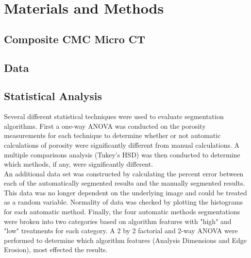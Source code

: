 \documentclass[12pt]{article}
\begin{document}
\section{Materials and Methods}

\subsection{Composite CMC Micro CT } 

\subsection{Data}

\subsection{Statistical Analysis} 
Several different statistical techniques were used to evaluate segmentation algorithms. First a one-way ANOVA was conducted on the porosity measurements for each technique to determine whether or not automatic calculations of porosity were significantly different from manual calculations. A multiple comparisons analysis (Tukey's HSD) was then conducted to determine which methods, if any, were significantly different.\\

An additional data set was constructed by calculating the percent error between each of the automatically segmented results and the manually segmented results. This data was no longer dependent on the underlying image and could be treated as a random variable. Normality of data was checked by plotting the histograms for each automatic method. Finally, the four automatic methods segmentations were broken into two categories based on algorithm features with "high" and "low" treatments for each category. A 2 by 2 factorial and 2-way ANOVA were performed to determine which algorithm features (Analysis Dimensions and Edge Erosion), most effected the results. 
\end{document}
